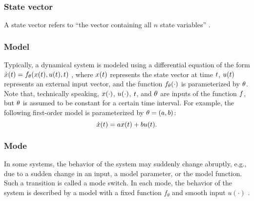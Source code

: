 \subsubsection{State vector}
\label{sec:state vector}
A state vector refers to ``the vector containing all $n$ state variables'' \autocite[p.~233]{dorf2011modern}.
\cend

\subsubsection{Model}
\label{sec:model}
Typically, a dynamical system is modeled using a differential equation of the form $\dot{x}(t)=f_{\theta}(x(t), u(t), t)$ \autocite{norman2011control}, where $x(t)$ represents the state vector at time $t$, $u(t)$ represents an external input vector, and the function $f_{\theta}(\cdot)$ is parameterized by $\theta$.  Note that, technically speaking, $x(\cdot)$, $u(\cdot)$, $t$, and $\theta$ are inputs of the function $f$, but $\theta$ is assumed to be constant for a certain time interval. For example, the following first-order model is parameterized by $\theta=(a,b)$:
\begin{equation}
	\dot{x}(t) = a x(t) + b u(t).
\end{equation}


\subsubsection{Mode}
\label{sec:mode}
In some systems, the behavior of the system may suddenly change abruptly, e.g., due to a sudden change in an input, a model parameter, or the model function. Such a transition is called a mode switch.
In each mode, the behavior of the system is described by a model with a fixed function $f_{\theta}$ and smooth input $u(\cdot)$ \autocite{deschutter2000optimal}.

